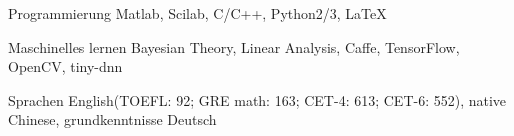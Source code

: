 


\begin{cvskills}


\cvskill
{Programmierung} %
{Matlab, Scilab, C/C++, Python2/3, LaTeX} %


\cvskill
{Maschinelles lernen} %
{Bayesian Theory, Linear Analysis, Caffe, TensorFlow, OpenCV, tiny-dnn} %


\cvskill
{Sprachen} %
{English(TOEFL: 92; GRE math: 163; CET-4: 613; CET-6: 552), native Chinese, grundkenntnisse Deutsch} %


\end{cvskills}
